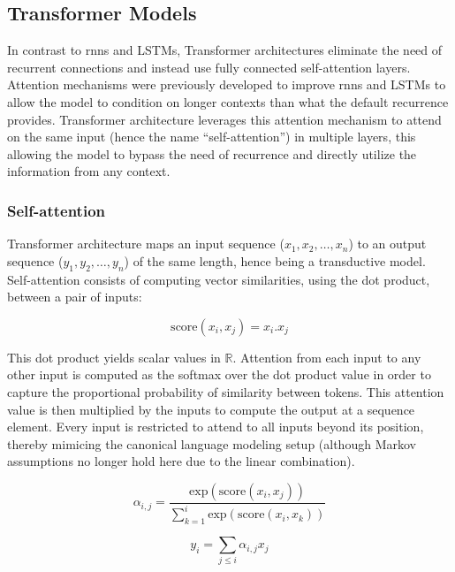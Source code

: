 \documentclass[letterpaper, 12pt]{report}
\begin{document}
\subsection{Transformer Models}
\label{sec:bg_transformers}

In contrast to \acrshort{rnn}s and LSTMs, Transformer \citep{vaswani-etal-2017-attention} architectures eliminate the need of recurrent connections and instead use fully connected self-attention layers. Attention mechanisms \citep{bahdanau2014neural} were previously developed to improve \acrshort{rnn}s and LSTMs to allow the model to condition on longer contexts than what the default recurrence provides. Transformer architecture leverages this attention mechanism to attend on the same input (hence the name ``self-attention'') in multiple layers, this allowing the model to bypass the need of recurrence and directly utilize the information from any context.

\subsubsection{Self-attention}

Transformer architecture maps an input sequence ($x_{1}, x_{2}, \ldots, x_{n}$) to an output sequence ($y_{1}, y_{2}, \ldots, y_{n}$) of the same length, hence being a transductive model. Self-attention consists of computing vector similarities, using the dot product, between a pair of inputs:

\begin{equation}
  \text{score}(x_{i},x_{j}) = x_{i}.x_{j}
\end{equation}

This dot product yields scalar values in $\mathbb{R}$. Attention from each input to any other input is computed as the softmax over the dot product value in order to capture the proportional probability of similarity between tokens. This attention value is then multiplied by the inputs to compute the output at a sequence element. Every input is restricted to attend to all inputs beyond its position, thereby mimicing the canonical language modeling setup (although Markov assumptions no longer hold here due to the linear combination).

\begin{equation}
  \alpha_{i,j} = \frac{\text{exp}(\text{score}(x_{i},x_{j}))}{\sum_{k=1}^{i}\text{exp}(\text{score}(x_{i},x_{k}))}
\end{equation}

\begin{equation}
  y_{i} = \sum_{j \le i}\alpha_{i,j}x_{j}
\end{equation}
\end{document}
